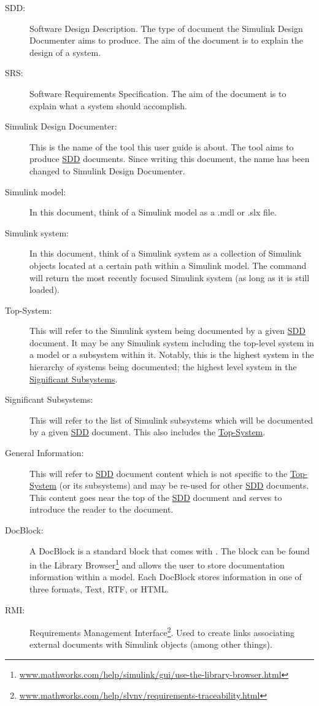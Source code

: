 \documentclass{mcscert}
\newcommand{\simulink}{Simulink}
\newcommand{\sddtool}{Simulink Design Documenter}
\newcommand{\topsystemnolink}{Top-System} %
\newcommand{\topsystem}{\hyperref[def:topsystem]{\topsystemnolink{}}}
\newcommand{\sigsubsnolink}{Significant Subsystems} %
\newcommand{\sigsubs}{\hyperref[def:sigsubs]{\sigsubsnolink{}}}
\newcommand{\geninfonolink}{General Information}
\begin{document}
\begin{description}
	\item[SDD:] \label{acr:sdd} Software Design Description. 
	The type of document the \sddtool{} aims to produce. 
	The aim of the document is to explain the design of a system.
	\item[SRS:] \label{acr:srs} Software Requirements Specification. 
	The aim of the document is to explain what a system should accomplish.
	\item[\sddtool{}\label{def:sddtool}:] This is the name of the tool this user guide is about. 
	The tool aims to produce \hyperref[acr:sdd]{SDD} documents. 
	Since writing this document, the name has been changed to Simulink Design Documenter.
	\item[\simulink{} model:] In this document, think of a \simulink{} model as a .mdl or .slx file.
	\item[\simulink{} system:] In this document, think of a \simulink{} system as a collection of \simulink{} objects located at a certain path within a \simulink{} model. 
	The  command will return the most recently focused \simulink{} system (as long as it is still loaded).
	\item[\topsystemnolink{}\label{def:topsystem}:] This will refer to the \simulink{} system being documented by a given \hyperref[acr:sdd]{SDD} document. 
	It may be any \simulink{} system including the top-level system in a model or a subsystem within it. 
	Notably, this is the highest system in the hierarchy of systems being documented; the highest level system in the \sigsubs{}.
	\item[\sigsubsnolink{}\label{def:sigsubs}:] This will refer to the list of \simulink{} subsystems which will be documented by a given \hyperref[acr:sdd]{SDD} document. 
	This also includes the \topsystem{}.
	\item[\geninfonolink{}\label{def:general-info}:] This will refer to \hyperref[acr:sdd]{SDD} document content which is not specific to the \topsystem{} (or its subsystems) and may be re-used for other \hyperref[acr:sdd]{SDD} documents. 
	This content goes near the top of the \hyperref[acr:sdd]{SDD} document and serves to introduce the reader to the document.
	\item[DocBlock\label{def:docblock}:] A \textsf{DocBlock} is a standard block that comes with \matlab{}. 
	The block can be found in the Library Browser\footnote{\label{library-browser}\href{https://www.mathworks.com/help/simulink/gui/use-the-library-browser.html}{www.mathworks.com/help/simulink/gui/use-the-library-browser.html}} and allows the user to store documentation information within a model. 
	Each \textsf{DocBlock} stores information in one of three formats, Text, RTF, or HTML.
	\item[RMI:] \label{acr:rmi} Requirements Management Interface\footnote{\href{https://www.mathworks.com/help/slvnv/requirements-traceability.html}{www.mathworks.com/help/slvnv/requirements-traceability.html}}. 
	Used to create links associating external documents with \simulink{} objects (among other things). %
\end{description}
 
\end{document}

